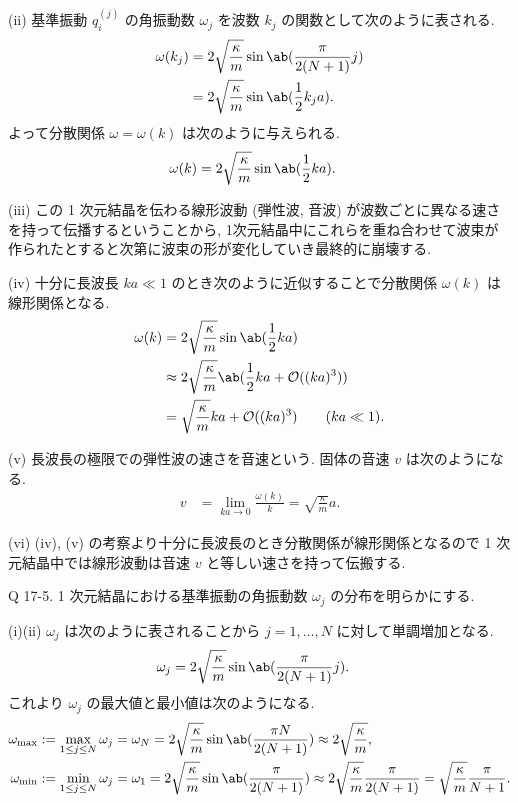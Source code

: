 \documentclass[uplatex,dvipdfmx,a4paper,11pt]{jlreq}
\numberwithin{equation}{section}
\theoremstyle{definition}
\begin{document}
(ii) 基準振動 $q_i^{(j)}$ の角振動数 $\omega_j$ を波数 $k_j$ の関数として次のように表される.
\begin{align}
  \omega(k_j) & = 2\sqrt{\frac{\kappa}{m}}\sin\ab(\frac{\pi}{2(N+1)}j) \\
              & = 2\sqrt{\frac{\kappa}{m}}\sin\ab(\frac{1}{2}k_ja).
\end{align}
よって分散関係 $\omega = \omega(k)$ は次のように与えられる.
\begin{align}
  \omega(k) & = 2\sqrt{\frac{\kappa}{m}}\sin\ab(\frac{1}{2}ka).
\end{align}

(iii) この 1 次元結晶を伝わる線形波動 (弾性波, 音波) が波数ごとに異なる速さを持って伝播するということから, 1次元結晶中にこれらを重ね合わせて波束が作られたとすると次第に波束の形が変化していき最終的に崩壊する.

(iv) 十分に長波長 $ka\ll 1$ のとき次のように近似することで分散関係 $\omega(k)$ は線形関係となる.
\begin{align}
  \omega(k) & = 2\sqrt{\frac{\kappa}{m}}\sin\ab(\frac{1}{2}ka)                         \\
            & \approx 2\sqrt{\frac{\kappa}{m}}\ab(\frac{1}{2}ka + \mathcal{O}((ka)^3)) \\
            & = \sqrt{\frac{\kappa}{m}}ka + \mathcal{O}((ka)^3) \qquad (ka\ll 1).
\end{align}

(v) 長波長の極限での弾性波の速さを音速という. 固体の音速 $v$ は次のようになる.
\begin{align}
  v & = \lim_{ka\to 0}\frac{\omega(k)}{k} = \sqrt{\frac{\kappa}{m}}a.
\end{align}

(vi) (iv), (v) の考察より十分に長波長のとき分散関係が線形関係となるので 1 次元結晶中では線形波動は音速 $v$ と等しい速さを持って伝搬する.

\begin{itembox}[l]{Q 17-5.}
  1 次元結晶における基準振動の角振動数 $\omega_j$ の分布を明らかにする.
\end{itembox}

(i)(ii) $\omega_j$ は次のように表されることから $j=1,\ldots,N$ に対して単調増加となる.
\begin{align}
  \omega_j & = 2\sqrt{\frac{\kappa}{m}}\sin\ab(\frac{\pi}{2(N+1)}j).
\end{align}
これより $\omega_j$ の最大値と最小値は次のようになる.
\begin{align}
  \omega_{\max} & := \max_{1\leq j\leq N}\omega_j = \omega_N = 2\sqrt{\frac{\kappa}{m}}\sin\ab(\frac{\pi N}{2(N+1)}) \approx 2\sqrt{\frac{\kappa}{m}},                                                          \\
  \omega_{\min} & := \min_{1\leq j\leq N}\omega_j = \omega_1 = 2\sqrt{\frac{\kappa}{m}}\sin\ab(\frac{\pi}{2(N+1)}) \approx 2\sqrt{\frac{\kappa}{m}}\frac{\pi}{2(N+1)} = \sqrt{\frac{\kappa}{m}}\frac{\pi}{N+1}.
\end{align}
\end{document}
